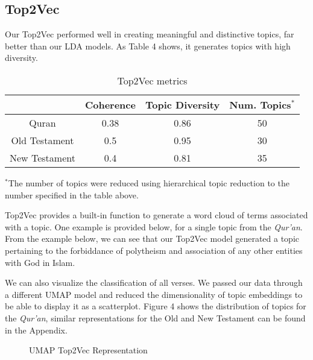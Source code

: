 \documentclass{article}
\begin{document}
\subsection{Top2Vec}
    Our Top2Vec performed well in creating meaningful and distinctive topics, far better than our LDA models. As Table 4 shows, it generates topics with high diversity. 
    \begin{table}[H]
            \centering
            \begin{tabular}{|c|c|c|c|}
                \hline
                 &  Coherence & Topic Diversity &Num. Topics$^*$\\
                \hline
                Quran & 0.38&0.86&50\\
                \hline 
                Old Testament & 0.5&0.95&30\\
                \hline
                New Testament & 0.4&0.81&35\\
                \hline 
            \end{tabular}
            \caption{Top2Vec metrics}
            \label{}
             $^*$The number of topics were reduced using hierarchical topic reduction to the number specified in the table above. 
    \end{table}
    
    Top2Vec provides a built-in function to generate a word cloud of terms associated with a topic. One example is provided below, for a single topic from the \textit{Qur'an}. From the example below, we can see that our Top2Vec model generated a topic pertaining to the forbiddance of polytheism and association of any other entities with God in Islam. 
    \begin{figure}[H]
        \centering
    \end{figure}

    We can also visualize the classification of all verses. We passed our data through a different UMAP model and reduced the dimensionality of topic embeddings to be able to display it as a scatterplot. Figure 4 shows the distribution of topics for the \textit{Qur'an}, similar representations for the Old and New Testament can be found in the Appendix. 
    \begin{figure}[H]
        \centering
        \caption{UMAP Top2Vec Representation}
        \label{fig:enter-label}
    \end{figure}
\end{document}
